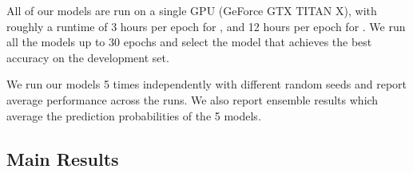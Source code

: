 All of our models are run on a single GPU (GeForce GTX TITAN X), with roughly a runtime of 3 hours per epoch for , and 12 hours per epoch for . We run all the models up to $30$ epochs and select the model that achieves the best accuracy on the development set.


We run our models 5 times independently with different random seeds and report average performance across the runs. We also report ensemble results which average the prediction probabilities of the 5 models.




\subsection{Main Results}

